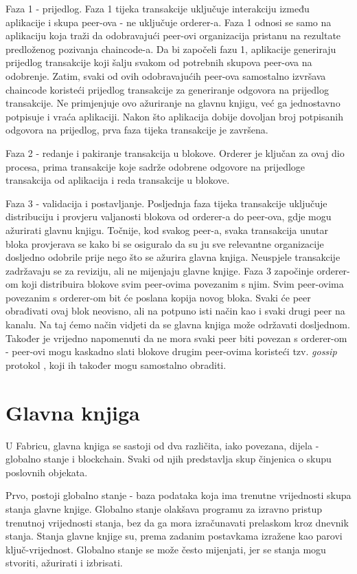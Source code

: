 \documentclass[times, utf8, diplomski]{fer}
\begin{document}
Faza 1 - prijedlog.  Faza 1 tijeka transakcije uključuje interakciju između aplikacije i skupa peer-ova - ne uključuje orderer-a. Faza 1 odnosi se samo na aplikaciju koja traži da odobravajući peer-ovi organizacija pristanu na rezultate predloženog pozivanja chaincode-a. Da bi započeli fazu 1, aplikacije generiraju prijedlog transakcije koji šalju svakom od potrebnih skupova peer-ova na odobrenje. Zatim, svaki od ovih odobravajućih peer-ova samostalno izvršava chaincode koristeći prijedlog transakcije za generiranje odgovora na prijedlog transakcije. Ne primjenjuje ovo ažuriranje na glavnu knjigu, već ga jednostavno potpisuje i vraća aplikaciji. Nakon što aplikacija dobije dovoljan broj potpisanih odgovora na prijedlog, prva faza tijeka transakcije je završena.

Faza 2 - redanje i pakiranje transakcija u blokove. Orderer je ključan za ovaj dio procesa, prima transakcije koje sadrže odobrene odgovore na prijedloge transakcija od aplikacija i reda transakcije u blokove.

Faza 3 - validacija i postavljanje.  Posljednja faza tijeka transakcije uključuje distribuciju i provjeru valjanosti blokova od orderer-a do peer-ova, gdje mogu ažurirati glavnu knjigu. Točnije, kod svakog peer-a, svaka transakcija unutar bloka provjerava se kako bi se osiguralo da su ju sve relevantne organizacije dosljedno odobrile prije nego što se ažurira glavna knjiga.  Neuspjele transakcije zadržavaju se za reviziju, ali ne mijenjaju glavne knjige.  Faza 3 započinje orderer-om koji distribuira blokove svim peer-ovima povezanim s njim.  Svim peer-ovima povezanim s orderer-om bit će poslana kopija novog bloka. Svaki će peer obrađivati ovaj blok neovisno, ali na potpuno isti način kao i svaki drugi peer na kanalu. Na taj ćemo način vidjeti da se glavna knjiga može održavati dosljednom. Također je vrijedno napomenuti da ne mora svaki peer biti povezan s orderer-om - peer-ovi mogu kaskadno slati blokove drugim peer-ovima koristeći tzv. \textit{gossip} protokol \cite{gossip-protocol},  koji ih također mogu samostalno obraditi.

\section{Glavna knjiga}
U Fabricu, glavna knjiga se sastoji od dva različita, iako povezana, dijela - globalno stanje i blockchain. Svaki od njih predstavlja skup činjenica o skupu poslovnih objekata. \cite{Fabric}

Prvo, postoji globalno stanje - baza podataka koja ima trenutne vrijednosti skupa stanja glavne knjige. Globalno stanje olakšava programu za izravno pristup trenutnoj vrijednosti stanja,  bez da ga mora izračunavati prelaskom kroz dnevnik stanja.  Stanja glavne knjige su, prema zadanim postavkama izražene kao parovi ključ-vrijednost. Globalno stanje se može često mijenjati, jer se stanja mogu stvoriti, ažurirati i izbrisati.
\end{document}
